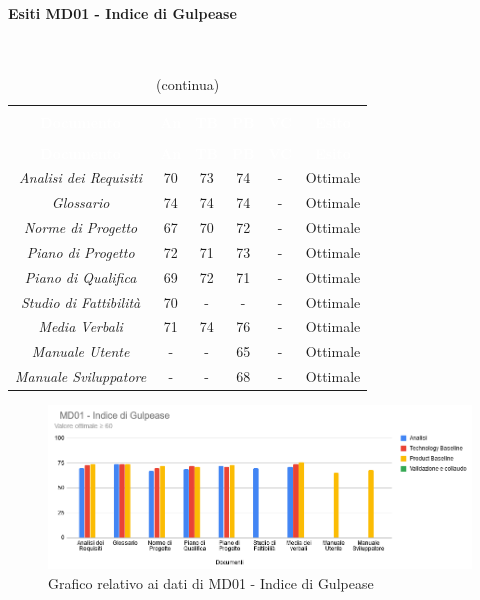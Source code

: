 \paragraph{Esiti MD01 - Indice di Gulpease} \mbox{} \\
\begin{longtable}{c c c c c c}
\rowcolor{white}\caption{Esiti MD01 - Indice di Gulpease} \\
		\rowcolor{redafk}
\textcolor{white}{\textbf{Documento}} &
\textcolor{white}{\textbf{An}} &
\textcolor{white}{\textbf{TB}} &
\textcolor{white}{\textbf{PB}} &
\textcolor{white}{\textbf{VC}} &
\textcolor{white}{\textbf{Esito}} \\
		\endfirsthead
		\rowcolor{white}\caption[]{(continua)} \\
		\rowcolor{redafk}
\textcolor{white}{\textbf{Documento}} &
\textcolor{white}{\textbf{An}} &
\textcolor{white}{\textbf{TB}} &
\textcolor{white}{\textbf{PB}} &
\textcolor{white}{\textbf{VC}} &
\textcolor{white}{\textbf{Esito}} \\
		\endhead
		\textit{Analisi dei Requisiti} & 70 & 73 & 74 & - & Ottimale \\
		\textit{Glossario} & 74 & 74 & 74 & - & Ottimale \\
		\textit{Norme di Progetto} & 67 & 70 & 72 & - & Ottimale \\
		\textit{Piano di Progetto} & 72 & 71 & 73 & - & Ottimale \\
		\textit{Piano di Qualifica} & 69 & 72 & 71 & - & Ottimale \\
		\textit{Studio di Fattibilità} & 70 & - & - & - & Ottimale \\
		\textit{Media Verbali} & 71 & 74 & 76 & - & Ottimale\\
		\textit{Manuale Utente} & - & - & 65 & - & Ottimale \\
		\textit{Manuale Sviluppatore} & - & - & 68 & - & Ottimale \\
\end{longtable}

\begin{figure}[H]
\centering
\includegraphics[scale=0.6]{./img/MD01_gulpease.png}
\caption{Grafico relativo ai dati di MD01 - Indice di Gulpease}
\end{figure}

